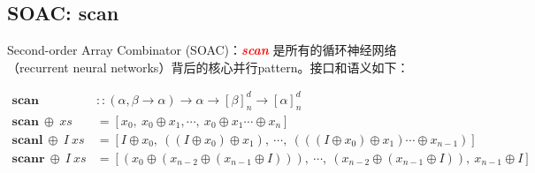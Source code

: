 \subsection{SOAC: scan}

Second-order Array Combinator (SOAC)：\textcolor{red}{\textit{\textbf{scan}}} 是所有的循环神经网络（recurrent neural networks）背后的核心并行pattern。接口和语义如下：

\begin{equation*}
    \begin{aligned}
        \textbf{scan} &::(\alpha, \beta \rightarrow \alpha) \rightarrow \alpha \rightarrow[\beta]^d_n \rightarrow [\alpha]_n^d \\
        \mathbf{scan} \ \oplus \ \textit{xs} &= [x_0,\ x_0 \oplus x_1, \dotsb,\ x_0 \oplus x_1 \dotsb \oplus x_n ] \\
        \mathbf{scanl} \ \oplus \ I \ \textit{xs} &= \left[
            I \oplus x_0,\  ((I \oplus x_0) \oplus x_1), \ \dotsb,
            \ (((I \oplus x_0)\oplus x_1)\dotsb \oplus x_{n-1})
        \right] \\
        \mathbf{scanr} \ \oplus \ I \ \textit{xs} &= \left[
            (x_0 \oplus (x_{n-2} \oplus (x_{n-1} \oplus I)))
            ,\ \dotsb, \ (x_{n-2} \oplus (x_{n-1} \oplus I)),
            \ x_{n-1} \oplus I \right] \\
    \end{aligned}
\end{equation*}






